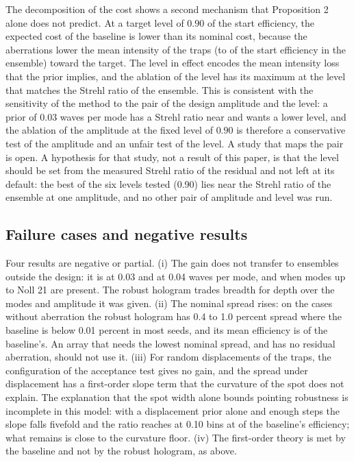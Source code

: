 The decomposition of the cost shows a second mechanism that Proposition 2 alone does not predict. At a target level of $0.90$ of the start efficiency, the expected cost of the baseline is lower than its nominal cost, because the aberrations lower the mean intensity of the traps (to \effDropOne{} of the start efficiency in the ensemble) toward the target. The level in effect encodes the mean intensity loss that the prior implies, and the ablation of the level has its maximum at the level
that matches the Strehl ratio of the ensemble. This is consistent with the sensitivity of the method to the pair of the design amplitude and the level: a prior of 0.03 waves per mode has a Strehl ratio near \strehlThree{} and wants a lower level, and the ablation of the amplitude at the fixed level of $0.90$ is therefore a conservative test of the amplitude and an unfair test of the level. A study that maps the pair is open. A hypothesis for that study, not a result of this paper, is that the level should be set from the measured Strehl ratio of
the residual and not left at its default: the best of the six levels tested (0.90) lies near the Strehl ratio of the ensemble at one amplitude, and no other pair of amplitude and level was run.

\subsection{Failure cases and negative results}

Four results are negative or partial. (i) The gain does not transfer to ensembles outside the design: it is \misDMed{} at 0.03 and \misEMed{} at 0.04 waves per mode, and \misGMed{} when modes up to Noll 21 are present. The robust hologram trades breadth for depth over the modes and amplitude it was given. (ii) The nominal spread rises: on the cases without aberration the robust hologram has 0.4 to 1.0 percent spread where the baseline is below 0.01 percent in most seeds, and its mean efficiency is \effRatioMed{} of the baseline's.
An array that needs the lowest nominal spread, and has no residual aberration, should not use it. (iii) For random displacements of the traps, the configuration of the acceptance test gives no gain, and the spread under displacement has a first-order slope term that the curvature of the spot does not explain. The explanation that the spot width alone bounds pointing robustness is incomplete in this model: with a displacement prior alone and enough steps the slope falls fivefold and the ratio reaches \poBLong{} at 0.10 bins at \poBLongEff{} of the baseline's efficiency; what remains is close to the curvature floor.
(iv) The first-order theory is met by the baseline and not by the robust hologram, as above.

